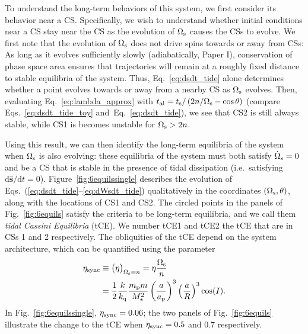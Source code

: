 \documentclass[
        fleqn,
        usenatbib,
    ]{mnras}
\newcommand*{\rdil}[2]{\mathrm{d}#1/\mathrm{d}#2}
\newcommand*{\p}[1]{\left(#1\right)}
\newcommand*{\uv}[1]{\hat{\boldsymbol{\mathbf{#1}}}}
\begin{document}
To understand the long-term behaviors of this system, we first consider its
behavior near a CS\@. Specifically, we wish to understand whether initial
conditions near a CS stay near the CS as the evolution of $\Omega_{\rm s}$
causes the CSs to evolve. We first note that the evolution of
$\Omega_{\rm s}$ does not drive spins towards or away from CSs: As long as it
evolves sufficiently slowly (adiabatically, Paper I), conservation of
phase space area ensures that trajectories will remain at a roughly fixed
distance to stable equilibria of the system. Thus, Eq.~\eqref{eq:dsdt_tide}
alone determines whether a point evolves towards or away from a nearby CS as
$\Omega_{\rm s}$ evolves. Then, evaluating Eq.~\eqref{eq:lambda_approx} with
$t_{\rm al} = t_{\rm s} / \p{2n / \Omega_{\rm s} - \cos \theta}$ (compare
Eqs.~\ref{eq:dsdt_tide_toy} and~Eq.~\ref{eq:dsdt_tide}), we see that CS2 is
still always stable, while CS1 is becomes unstable for $\Omega_{\rm s} > 2n$.

Using this result, we can then identify the long-term equilibria of the system
when $\Omega_{\rm s}$ is also evolving: these equilibria of the system must both
satisfy $\dot{\Omega}_{\rm s} = 0$ and be a CS that is stable in the presence of
tidal dissipation (i.e.\ satisfying $\rdil{\uv{s}}{t} = 0$).
Figure~\ref{fig:6equilssingle} describes the evolution of
Eqs.~(\ref{eq:dsdt_tide}--\ref{eq:dWsdt_tide}) qualitatively in the coordinates
$(\Omega_{\rm s}, \theta)$, along with the locations of CS1 and CS2. The circled
points in the panels of Fig.~\ref{fig:6equils} satisfy the criteria to be
long-term equilibria, and we call them \emph{tidal Cassini Equilibria} (tCE). We
number tCE1 and tCE2 the tCE that are in CSs 1 and 2 respectively. The
obliquities of the tCE depend on the system architecture, which can be
quantified using the parameter
\begin{align}
    \eta_{\rm sync} &\equiv \big(\eta\big)_{\Omega_{\rm s} = n}
        = \eta \frac{\Omega_{\rm s}}{n}\nonumber\\
        &= \frac{1}{2}\frac{k}{k_{\rm q}}
            \frac{m_{\rm p}m}{M_\star^2}
            \p{\frac{a}{a_{\rm p}}}^3 \p{\frac{a}{R}}^3\cos(I).
            \label{eq:def_etasync}
\end{align}
In Fig.~\ref{fig:6equilssingle}, $\eta_{\rm sync} = 0.06$; the two panels of
Fig.~\ref{fig:6equils} illustrate the change to the tCE when $\eta_{\rm sync} =
0.5$ and $0.7$ respectively.
\end{document}
